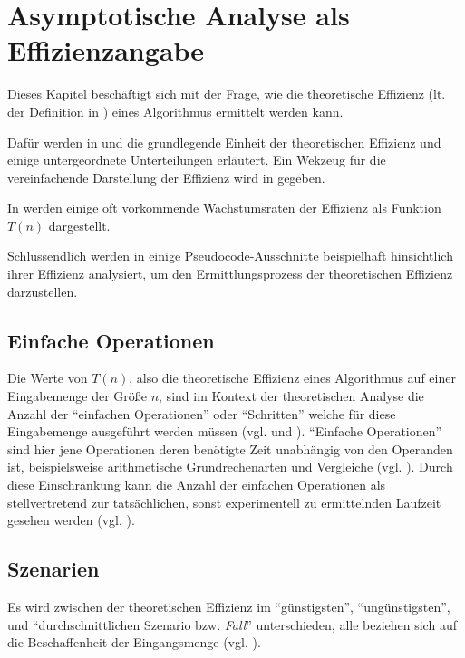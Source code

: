 \chapter{Asymptotische Analyse als Effizienzangabe}
\label{cha:asymptotic-analysis}

Dieses Kapitel beschäftigt sich mit der Frage, wie die theoretische Effizienz (lt. der Definition in ) eines Algorithmus ermittelt werden kann.

Dafür werden in  und  die grundlegende Einheit der theoretischen Effizienz und einige untergeordnete Unterteilungen erläutert. Ein Wekzeug für die vereinfachende Darstellung der Effizienz wird in  gegeben.

In  werden einige oft vorkommende Wachstumsraten der Effizienz als Funktion $T(n)$ dargestellt.

Schlussendlich werden in  einige Pseudocode-Ausschnitte beispielhaft hinsichtlich ihrer Effizienz analysiert, um den Ermittlungsprozess der theoretischen Effizienz darzustellen.

\section{Einfache Operationen}
\label{sec:einfache-operationen}

Die Werte von $T(n)$, also die theoretische Effizienz eines Algorithmus auf einer Eingabemenge der Größe $n$, sind im Kontext der theoretischen Analyse die Anzahl der \enquote{einfachen Operationen} oder \enquote{Schritten} welche für diese Eingabemenge ausgeführt werden müssen (vgl. \cite[25]{clrs2001} und \cite[18f]{hsr1997}). \enquote{Einfache Operationen} sind hier jene Operationen deren benötigte Zeit unabhängig von den Operanden ist, beispielsweise arithmetische Grundrechenarten und Vergleiche (vgl. \cite[55]{sha2011}). Durch diese Einschränkung kann die Anzahl der einfachen Operationen als stellvertretend zur tatsächlichen, sonst experimentell zu ermittelnden Laufzeit gesehen werden (vgl. \cite[55]{sha2011}).

\section{Szenarien}
\label{sec:asymptotic-cases}

Es wird zwi\-schen der theoretischen Effizienz im \enquote{günstigsten}, \enquote{ungünstigsten}, und \enquote{durchschnittlichen Szenario bzw. \emph{Fall}} unterschieden, alle beziehen sich auf die Beschaffenheit der Eingangsmenge (vgl. \cite[28]{hsr1997}).

